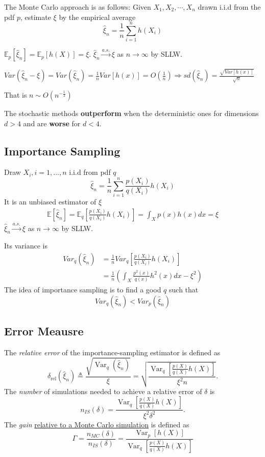 \documentclass[11pt]{elegantbook}
\begin{document}
The Monte Carlo approach is as follows: Given $X_1, X_2, \cdots, X_n$ drawn i.i.d from the pdf
$p$, estimate $\xi $ by the empirical average $$\hat{\xi}_n=\frac{1}{n}\sum_{i=1}^nh(X_i)$$

$\mathbb{E}_p[\hat{\xi}_n]=\mathbb{E}_p[h(X)]=\xi$. $\hat{\xi}_n \stackrel{a.s.}{\longrightarrow}\xi$ as $n \rightarrow \infty$ by SLLW.

$Var(\hat{\xi}_n-\xi)=Var(\hat{\xi}_n)=\frac{1}{n}Var[h(x)]=O\left(\frac{1}{n}\right) \Rightarrow sd(\hat{\xi}_n)=\frac{\sqrt{Var[h(x)]}}{\sqrt{n}}$

That is $n\sim O\left(n^{-\frac{1}{2}}\right)$

The stochastic methods \textbf{outperform} when the deterministic ones for dimensions \underline{$d >4$} and are \textbf{worse} for \underline{$d<4$}.

\subsection{Importance Sampling}
Draw $X_i,i=1,...,n$ i.i.d from pdf $q$ $$\hat{\xi}_n=\frac{1}{n}\sum_{i=1}^n\frac{p(X_i)}{q(X_i)}h(X_i)$$
It is an unbiased estimator of $\xi$
\begin{equation}
    \begin{aligned}
        \mathbb{E}[\hat{\xi}_n]=\mathbb{E}_q[\frac{p(X_i)}{q(X_i)}h(X_i)]=\int_X p(x)h(x)dx=\xi
    \end{aligned}
    \nonumber
\end{equation}
$\hat{\xi}_n \stackrel{a.s.}{\longrightarrow}\xi$ as $n \rightarrow \infty$ by SLLW.

Its variance is
\begin{equation}
    \begin{aligned}
        {Var}_q(\hat{\xi}_n)&=\frac{1}{n}{Var}_q\left[\frac{p(X_i)}{q(X_i)}h(X_i)\right]\\
        &=\frac{1}{n}\left(\int_X\frac{p^2(x)}{q(x)}h^2(x)dx-\xi^2\right)
    \end{aligned}
    \nonumber
\end{equation}
The idea of importance sampling is to find a good $q$ such that $${Var}_q(\hat{\xi}_n)<{Var}_p(\hat{\xi}_n)$$

\subsection*{Error Meausre}
The \textit{relative error} of the importance-sampling estimator is defined as
$$
\delta_{\mathrm{rel}}\left(\hat{\xi}_n\right) \triangleq \frac{\sqrt{\operatorname{Var}_q\left(\hat{\xi}_n\right)}}{\xi}=\sqrt{\frac{\operatorname{Var}_q\left[\frac{p(X)}{q(X)} h(X)\right]}{\xi^2 n}} .
$$
The \textit{number} of simulations needed to achieve a relative error of $\delta$ is
$$
n_{I S}(\delta)=\frac{\operatorname{Var}_q\left[\frac{p(X)}{q(X)} h(X)\right]}{\xi^2 \delta^2} .
$$
The \textit{gain} \underline{relative to a Monte Carlo simulation} is defined as
$$
\Gamma=\frac{n_{M C}(\delta)}{n_{I S}(\delta)}=\frac{\operatorname{Var}_p[h(X)]}{\operatorname{Var}_q\left[\frac{p(X)}{q(X)} h(X)\right]}
$$
\end{document}
